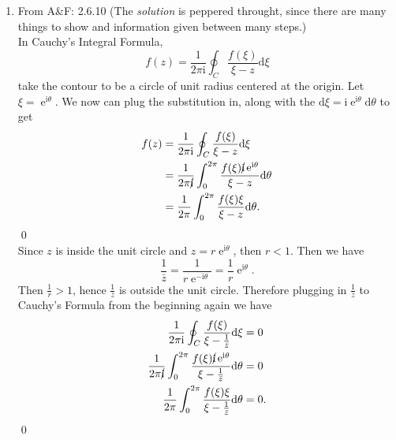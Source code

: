 \documentclass[10pt]{amsart}
\newcommand{\D}{\mathrm{d}}
\newcommand{\I}{\mathrm{i}}
\DeclareMathOperator{\E}{e}
\theoremstyle{nonumberplain}
\begin{document}
\begin{enumerate}[label={\bf {\arabic*}:}]
\item From A\&F: 2.6.10
(The \textit{solution} is peppered throught, since there are many things to show and information given between many steps.)\\
In Cauchy's Integral Formula,
$$
f(z) = \frac 1 {2\pi \I} \oint_C \frac{f(\xi)}{\xi - z} \D \xi
$$
take the contour to be a circle of unit radius centered at the origin.
Let $\xi = \E^{\I\theta}$.
We now can plug the substitution in, along with the $\D \xi = \I \E^{\I \theta} \D \theta$ to get
\begin{align*}
f(z) &= \frac 1 {2\pi \I} \oint_C \frac{f(\xi)}{\xi - z} \D \xi \\
	&= \frac 1 {2\pi \cancel{\I}} \int_0^{2\pi} \frac{f(\xi) \cancel{\I} \E^{\I \theta}}{\xi - z} \D \theta \\
	&= \frac 1 {2\pi} \int_0^{2\pi} \frac{f(\xi)\xi}{\xi - z} \D \theta.
\end{align*}
\qed \\
Since $z$ is inside the unit circle and $z=r\E^{\I \theta}$, then $r < 1$.
Then we have
$$ \frac 1 {\bar z} =  \frac 1 {r \E^{-\I \theta}} = \frac 1 r { \E^{\I \theta}}.$$
Then $\frac 1 r  > 1$, hence $\frac 1 {\bar z}$ is outside the unit circle.
Therefore plugging in $\frac 1 {\bar z}$ to Cauchy's Formula from the beginning again we have
\begin{align*}
\frac 1 {2\pi \I} \oint_C \frac{f(\xi)}{\xi - \frac 1 {\bar z}} \D \xi &= 0 \\
\frac 1 {2\pi \cancel{\I}} \int_0^{2\pi} \frac{f(\xi) \cancel{\I} \E^{\I \theta}}{\xi - \frac 1 {\bar z}} \D \theta &= 0 \\
\frac 1 {2\pi} \int_0^{2\pi} \frac{f(\xi)\xi}{\xi - \frac 1 {\bar z}} \D \theta &= 0.
\end{align*}
\qed \\


\end{enumerate}
\end{document}

